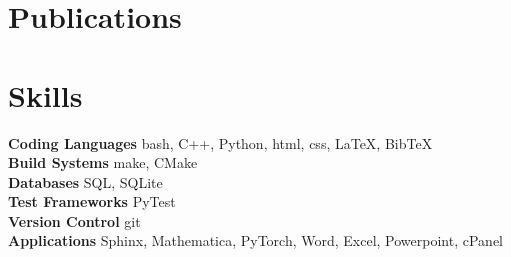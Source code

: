 \documentclass[margin,line]{resume}
\begin{document}
\begin{resume}
    \section{\mysidestyle Publications}

    \begin{bibenum}
        \item {}
        \item {}
        \item {}
        \item {}
    \end{bibenum}

    \section{\mysidestyle Skills}
                \textbf{Coding Languages} \hfill bash, C++, Python, html, css, \LaTeX, BibTeX \vspace{.5mm}\\%
                \textbf{Build Systems} \hfill make, CMake\vspace{.5mm}\\%
                \textbf{Databases} \hfill SQL, SQLite\vspace{.5mm}\\%
                \textbf{Test Frameworks} \hfill PyTest\vspace{.5mm}\\%
                \textbf{Version Control} \hfill git\vspace{.5mm}\\%
                \textbf{Applications} \hfill Sphinx, Mathematica, PyTorch, Word, Excel, Powerpoint, cPanel\vspace{.5mm}%


\end{resume}
\end{document}
